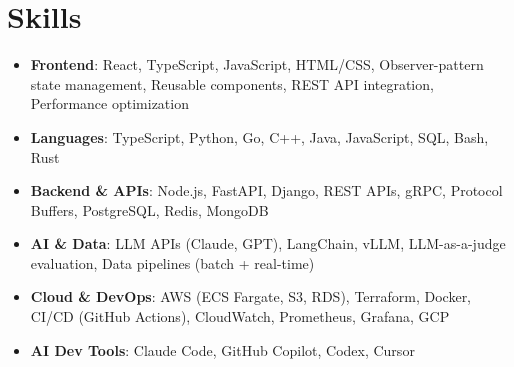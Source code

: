 \documentclass[letterpaper,11pt]{article}
\newcommand{\resumeSubHeadingListStart}{\begin{itemize}[leftmargin=0.15in, label={}]}
\newcommand{\resumeSubHeadingListEnd}{\end{itemize}}
\newcommand{\resumeSkillHeading}[2]{%
  \item\small{\textbf{#1}: #2 \vspace{-9pt}}%
}
\begin{document}
\section{Skills}
  \resumeSubHeadingListStart
    \resumeSkillHeading{Frontend}{React, TypeScript, JavaScript, HTML/CSS, Observer-pattern state management, Reusable components, REST API integration, Performance optimization}
    \resumeSkillHeading{Languages}{TypeScript, Python, Go, C++, Java, JavaScript, SQL, Bash, Rust}
    \resumeSkillHeading{Backend \& APIs}{Node.js, FastAPI, Django, REST APIs, gRPC, Protocol Buffers, PostgreSQL, Redis, MongoDB}
    \resumeSkillHeading{AI \& Data}{LLM APIs (Claude, GPT), LangChain, vLLM, LLM-as-a-judge evaluation, Data pipelines (batch + real-time)}
    \resumeSkillHeading{Cloud \& DevOps}{AWS (ECS Fargate, S3, RDS), Terraform, Docker, CI/CD (GitHub Actions), CloudWatch, Prometheus, Grafana, GCP}
    \resumeSkillHeading{AI Dev Tools}{Claude Code, GitHub Copilot, Codex, Cursor}
  \resumeSubHeadingListEnd
\end{document}
